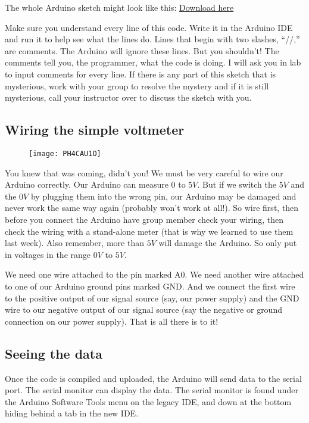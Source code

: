 The whole Arduino sketch might look like this:
\href{https://dtoliphant.github.io/PH250Manual/Code/DAQ_voltmeter.ino}{Download here}



Make sure you understand every line of this code. Write it in the Arduino IDE and run it to help see what the lines do. Lines that begin with two slashes, ``//,'' are comments. The Arduino will ignore these lines. But you shouldn't! The comments tell you, the programmer, what the code is doing. I will ask you in lab to input comments for every line. If there is any part of this sketch that is mysterious, work with your group to resolve the mystery and if it is still mysterious, call your instructor over to discuss the sketch with you.

\subsection{Wiring the simple voltmeter}

\begin{figure}[h!]
	\centering
	\texttt{[image: PH4CAU1O]}
\end{figure}

You knew that was coming, didn't you! We must be very careful to wire our Arduino correctly. Our Arduino can measure $0$ to $5\unit{V}.$ But if we switch the $5\unit{V}$ and the $0\unit{V}$ by plugging them into the wrong pin, our Arduino may be damaged and never work the same way again (probably won't work at all!). So wire first, then before you connect the Arduino have group member check your wiring, then check the wiring with a stand-alone meter (that is why we learned to use them last week). Also remember, more than $5\unit{V}$ will damage the Arduino. So only put in voltages in the range $0\unit{V}$ to $5 \unit{V}.$

We need one wire attached to the pin marked A0. We need another wire attached to one of our Arduino ground pins marked GND. And we connect the first wire to the positive output of our signal source (say, our power supply) and the GND wire to our negative output of our signal source (say the negative or ground connection on our power supply). That is all there is to it!

\subsection{Seeing the data}

Once the code is compiled and uploaded, the Arduino will send data to the serial port. The serial monitor can display the data. The serial monitor is found under the Arduino Software Tools menu on the legacy IDE, and down at the bottom hiding behind a tab in the new IDE.

